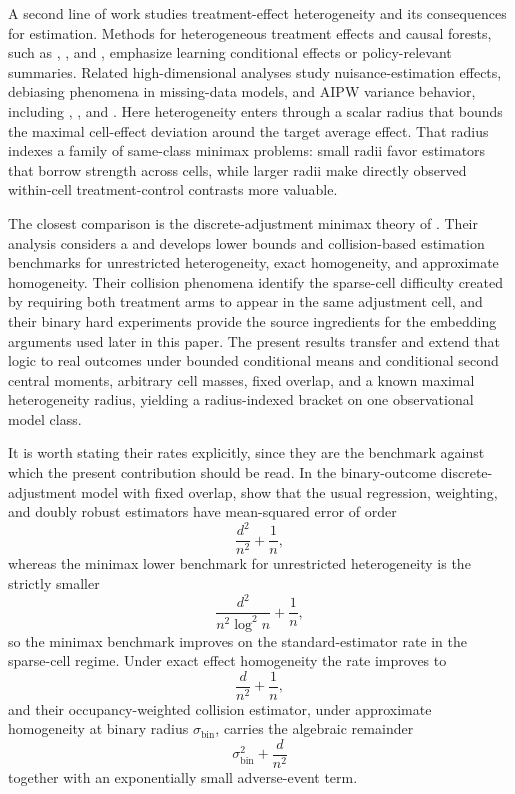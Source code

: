 \documentclass[11pt]{article}
\begin{document}
A second line of work studies treatment-effect heterogeneity and its consequences for estimation. Methods for heterogeneous treatment effects and causal forests, such as \citet{Wager2018}, \citet{Nie2021}, and \citet{Semenova2021}, emphasize learning conditional effects or policy-relevant summaries. Related high-dimensional analyses study nuisance-estimation effects, debiasing phenomena in missing-data models, and AIPW variance behavior, including \citet{Yadlowsky2022}, \citet{Celentano2023}, and \citet{Jiang2025}. Here heterogeneity enters through a scalar radius that bounds the maximal cell-effect deviation around the target average effect. That radius indexes a family of same-class minimax problems: small radii favor estimators that borrow strength across cells, while larger radii make directly observed within-cell treatment-control contrasts more valuable.

The closest comparison is the discrete-adjustment minimax theory of \citet{ZengBalakrishnanHanKennedy2024}. Their analysis considers a  and develops lower bounds and collision-based estimation benchmarks for unrestricted heterogeneity, exact homogeneity, and approximate homogeneity. Their collision phenomena identify the sparse-cell difficulty created by requiring both treatment arms to appear in the same adjustment cell, and their binary hard experiments provide the source ingredients for the embedding arguments used later in this paper. The present results transfer and extend that logic to real outcomes under bounded conditional means and conditional second central moments, arbitrary cell masses, fixed overlap, and a known maximal heterogeneity radius, yielding a radius-indexed bracket on one observational model class.

It is worth stating their rates explicitly, since they are the benchmark against which the present contribution should be read. In the binary-outcome discrete-adjustment model with fixed overlap, \citet{ZengBalakrishnanHanKennedy2024} show that the usual regression, weighting, and doubly robust estimators have mean-squared error of order
\[
\frac{d^2}{n^2}+\frac1n ,
\]
whereas the minimax lower benchmark for unrestricted heterogeneity is the strictly smaller
\[
\frac{d^2}{n^2\log^2 n}+\frac1n ,
\]
so the minimax benchmark improves on the standard-estimator rate in the sparse-cell regime. Under exact effect homogeneity the rate improves to
\[
\frac d{n^2}+\frac1n ,
\]
and their occupancy-weighted collision estimator, under approximate homogeneity at binary radius \(\sigma_{\mathrm{bin}}\), carries the algebraic remainder
\[
\sigma_{\mathrm{bin}}^2+\frac d{n^2}
\]
together with an exponentially small adverse-event term.
\end{document}
